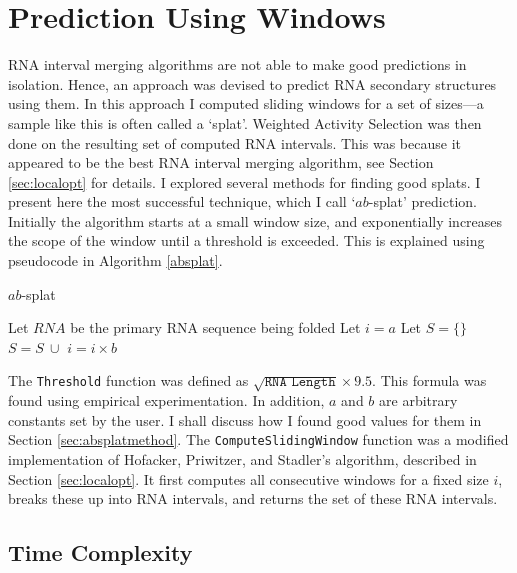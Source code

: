 \documentclass{cshonours}
\begin{document}
\section{Prediction Using Windows}
\label{sec:absplat}
RNA interval merging algorithms are not able to make good predictions in isolation. Hence, an approach was devised to predict RNA secondary structures using them. In this approach I computed sliding windows for a set of sizes---a sample like this is often called a `splat'. Weighted Activity Selection was then done on the resulting set of computed RNA intervals.  This was because it appeared to be the best RNA interval merging algorithm, see Section \ref{sec:localopt} for details. I explored several methods for finding good splats. I present here the most successful technique, which I call `$ab$-splat' prediction. Initially the algorithm starts at a small window size, and exponentially increases the scope of the window until a threshold is exceeded. This is explained using pseudocode in Algorithm \ref{absplat}.

\begin{algorithm}
  \caption{$ab$-splat}
  \label{absplat}
  \begin{algorithmic}[1]
  \State Let $RNA$ be the primary RNA sequence being folded
  \State Let $i = a$
  \State Let $S = \{\}$
  	\State $S = S \: \cup $ 
  	\State $i = i \times b$
  \EndWhile
  \State \Return {}
  \end{algorithmic}
\end{algorithm}

The \texttt{Threshold} function was defined as $\sqrt{ \texttt{RNA Length} } \times 9.5$. This formula was found using empirical experimentation. In addition, $a$ and $b$ are arbitrary constants set by the user. I shall discuss how I found good values for them in Section \ref{sec:absplatmethod}. The \texttt{ComputeSlidingWindow} function was a modified implementation of Hofacker, Priwitzer, and Stadler's \cite{hofacker2004prediction} algorithm, described in Section \ref{sec:localopt}. It first computes all consecutive windows for a fixed size $i$, breaks these up into RNA intervals, and returns the set of these RNA intervals.

\subsection{Time Complexity}
\end{document}
